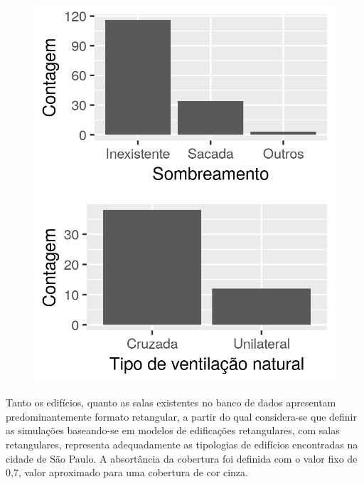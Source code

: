 \documentclass[brazil,hardcopy,openany,a4paper]{ufscthesis}
\begin{document}
\begin{figure}
\begin{minipage}{.5\textwidth}
		\end{minipage}
		\centering	
		\begin{minipage}{.5\textwidth}
			\centering
			\includegraphics[width=\linewidth]{img/hist_sombreamento.png}
		\end{minipage}%
		\begin{minipage}{.5\textwidth}
			\centering
			\includegraphics[width=\linewidth]{img/hist_tipo_vn.png}
		\end{minipage}
	\end{figure}
	
	Tanto os edifícios, quanto as salas existentes no banco de dados apresentam predominantemente formato retangular, a partir do qual considera-se que definir as simulações baseando-se em modelos de edificações retangulares, com salas retangulares, representa adequadamente as tipologias de edifícios encontradas na cidade de São Paulo.
	A absortância da cobertura foi definida com o valor fixo de 0,7, valor aproximado para uma cobertura de cor cinza.
	
\end{document}
